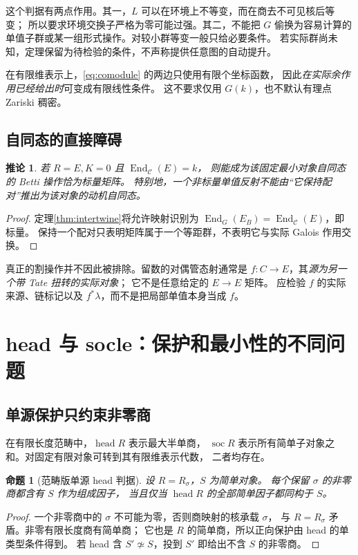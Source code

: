 \documentclass[11pt,a4paper]{ctexart}
\theoremstyle{cnplain}
\newtheorem{proposition}[theorem]{命题}
\newtheorem{corollary}[theorem]{推论}
\theoremstyle{definition}
\theoremstyle{remark}
\newcommand{\End}{\operatorname{End}}
\newcommand{\soc}{\operatorname{soc}}
\newcommand{\head}{\operatorname{head}}
\begin{document}
这个判据有两点作用。其一，$L$ 可以在环境上不等变，而在商去不可见核后等变；
所以要求环境交换子严格为零可能过强。其二，不能把 $G$ 偷换为容易计算的
单值子群或某一组形式操作。对较小群等变一般只给必要条件。
若实际群尚未知，定理保留为待检验的条件，不声称提供任意图的自动提升。

在有限维表示上，\eqref{eq:comodule} 的两边只使用有限个坐标函数，
因此\emph{在实际余作用已经给出时}可变成有限线性条件。
这不要求仅用 $G(k)$，也不默认有理点 Zariski 稠密。

\subsection{自同态的直接障碍}
\begin{corollary}\label{cor:scalar}
若 $R=E,K=0$ 且 $\End_{\mathcal C}(E)=k$，
则能成为该固定最小对象自同态的 Betti 操作恰为标量矩阵。
特别地，一个非标量单值反射不能由``它保持配对''推出为该对象的动机自同态。
\end{corollary}
\begin{proof}
定理\ref{thm:intertwine}将允许映射识别为
$\End_G(E_B)=\End_{\mathcal C}(E)$，即标量。
保持一个配对只表明矩阵属于一个等距群，不表明它与实际 Galois 作用交换。
\end{proof}

真正的割操作并不因此被排除。留数的对偶管态射通常是
$f:C\to E$，其\emph{源为另一个带 Tate 扭转的实际对象}；
它不是任意给定的 $E\to E$ 矩阵。
应检验 $f$ 的实际来源、链标记以及 $f^*\lambda$，而不是把局部单值本身当成 $f$。

\section{head 与 socle：保护和最小性的不同问题}
\subsection{单源保护只约束非零商}
在有限长度范畴中，$\head R$ 表示最大半单商，
$\soc R$ 表示所有简单子对象之和。对固定有限对象可转到其有限维表示代数，
二者均存在。

\begin{proposition}[范畴版单源 head 判据]\label{prop:head}
设 $R=R_\sigma$，$S$ 为简单对象。
每个保留 $\sigma$ 的非零商都含有 $S$ 作为组成因子，
当且仅当 $\head R$ 的全部简单因子都同构于 $S$。
\end{proposition}
\begin{proof}
一个非零商中的 $\sigma$ 不可能为零，否则商映射的核承载 $\sigma$，
与 $R=R_\sigma$ 矛盾。非零有限长度商有简单商；
它也是 $R$ 的简单商，所以正向保护由 head 的单类型条件得到。
若 head 含 $S'\not\simeq S$，投到 $S'$ 即给出不含 $S$ 的非零商。
\end{proof}
\end{document}
